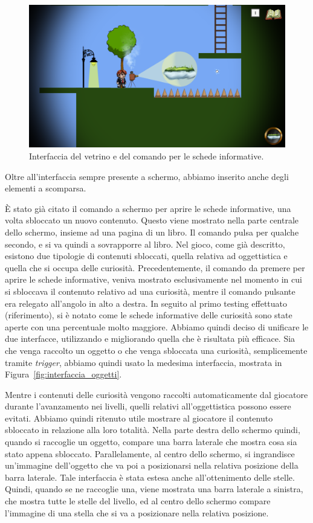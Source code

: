 \begin{figure}%
	\centering
	\includegraphics[width= 0.9\columnwidth]{images/gameDesign/56_interfaccia.png}
	\caption{Interfaccia del vetrino e del comando per le schede informative.}
	\label{fig:interfaccia_ingame}
\end{figure}

Oltre all’interfaccia sempre presente a schermo, abbiamo inserito anche degli elementi a scomparsa.

È stato già citato il comando a schermo per aprire le schede informative, una volta sbloccato un nuovo contenuto. Questo viene mostrato nella parte centrale dello schermo, insieme ad una pagina di un libro. Il comando pulsa per qualche secondo, e si va quindi a sovrapporre al libro.
Nel gioco, come già descritto, esistono due tipologie di contenuti sbloccati, quella relativa ad oggettistica e quella che si occupa delle curiosità. Precedentemente, il comando da premere per aprire le schede informative, veniva mostrato esclusivamente nel momento in cui si sbloccava il contenuto relativo ad una curiosità, mentre il comando pulsante era relegato all’angolo in alto a destra. In seguito al primo testing effettuato (riferimento), si è notato come le schede informative delle curiosità sono state aperte con una percentuale molto maggiore. Abbiamo quindi deciso di unificare le due interfacce, utilizzando e migliorando quella che è risultata più efficace.
Sia che venga raccolto un oggetto o che venga sbloccata una curiosità, semplicemente tramite \textit{trigger}, abbiamo quindi usato la medesima interfaccia, mostrata in Figura~\ref{fig:interfaccia_oggetti}.

Mentre i contenuti delle curiosità vengono raccolti automaticamente dal giocatore durante l’avanzamento nei livelli, quelli relativi all’oggettistica possono essere evitati. Abbiamo quindi ritenuto utile mostrare al giocatore il contenuto sbloccato in relazione alla loro totalità. Nella parte destra dello schermo quindi, quando si raccoglie un oggetto, compare una barra laterale che mostra cosa sia stato appena sbloccato.
Parallelamente, al centro dello schermo, si ingrandisce un’immagine dell’oggetto che va poi a posizionarsi nella relativa posizione della barra laterale.
Tale interfaccia è stata estesa anche all’ottenimento delle stelle. Quindi, quando se ne raccoglie una, viene mostrata una barra laterale a sinistra, che mostra tutte le stelle del livello, ed al centro dello schermo compare l’immagine di una stella che si va a posizionare nella relativa posizione.


